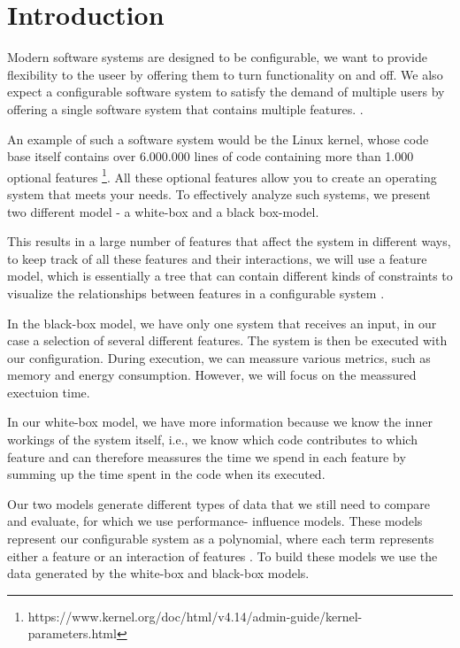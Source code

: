 \chapter{Introduction}\label{ch:introduction}

Modern software systems are designed to be configurable, we want to provide flexibility to the useer by offering them to turn functionality on 
and off. 
We also expect a configurable software system to satisfy the demand of multiple users by offering a single software system that 
contains multiple features. \cite{Feature-Oriented-Software-Product-Lines}. 

An example of such a software system would be the Linux kernel, whose code base itself contains over 6.000.000 lines of code containing more 
than 1.000 optional features \footnote{https://www.kernel.org/doc/html/v4.14/admin-guide/kernel-parameters.html}. 
All these optional features allow you to create an operating system that meets your needs. To effectively analyze such systems,
we present two different model - a white-box and a black box-model.

This results in a large number of features that affect the system in different ways, to keep track of all these features and their interactions,
we will use a feature model, which is essentially a tree that can contain different kinds of constraints to visualize the relationships 
between features in a configurable system \cite{KangFeatureOrientedDomain1990}.

In the black-box model, we have only one system that receives an input, in our case a selection of several different features.
The system is then be executed with our configuration. During execution, we can meassure various metrics, such as memory and energy
consumption. However, we will focus on the meassured exectuion time.

In our white-box model, we have more information because we know the inner workings of the
system itself, i.e., we know which code contributes to which feature and can therefore meassures the time we spend in each feature by summing
up the time spent in the code when its executed.

Our two models generate different types of data that we still need to compare and evaluate, for which we use performance-
influence models. These models represent our configurable system as a polynomial, where each term represents either a feature or an 
interaction of features \cite{Performance-influence-models-for-highly-configurable-systems}. To build these models we use the data generated 
by the white-box and black-box models.

